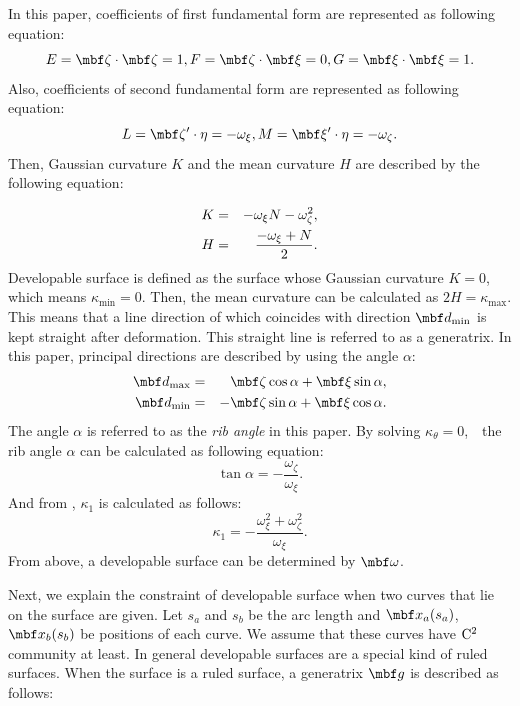 \documentclass[E]{scitrans}
\begin{document}
In this paper, coefficients of first fundamental form are represented as following equation:
\begin{equation}
E = \zetavec \cdot \zetavec = 1, F = \zetavec \cdot \xivec = 0, G = \xivec \cdot \xivec = 1.
\end{equation}
Also, coefficients of second fundamental form are represented as following equation:
\begin{equation}
L = \zetavec' \cdot \eta = -\omega_{\xi}, M = \xivec' \cdot \eta = -\omega_{\zeta}.
\end{equation}
Then, Gaussian curvature $K$ and the mean curvature $H$ are described by
the following equation:

\begin{eqnarray}
\label{eq:GC_expressed_omega}
K &=& -\omega_{\xi} N - \omega_{\zeta}^2, \\
H &=& {\displaystyle{\frac{-\omega_{\xi}+N}{2}}}.
\end{eqnarray}
Developable surface is defined as the surface whose Gaussian curvature $K = 0$, which means $\kappa_{\min}=0$. Then, the mean curvature can be calculated as $2H=\kappa_{\max}$. This means that a line direction of which coincides with direction $\mbold{d}_{\min}$ is kept straight after deformation. This straight line is referred to as a generatrix. 
In this paper, principal directions are described by using the angle $ \alpha $: 
\begin{eqnarray}\label{eq:d1d2_eq}
\mbold{d}_{\max} &=& \zetavec \cos \alpha + \xivec \sin \alpha, \nonumber \\ 
\mbold{d}_{\min} &=& -\zetavec \sin \alpha + \xivec \cos \alpha.
\end{eqnarray}
The angle $ \alpha $ is referred to as the \textit{rib angle} in this paper.
By solving $ \kappa_{\theta} = 0 $,　the rib angle $ \alpha $ can be calculated as following equation:
\begin{equation}\label{eq:alpha_eq}
\tan \alpha = -\frac{\omega_{\zeta}}{\omega_{\xi}}.
\end{equation}
And from , $\kappa_1$ is calculated as follows: 
\begin{equation}\label{eq:kappa1_eq}
\kappa_1 = -\frac{\omega_{\xi}^2 + \omega_{\zeta}^2}{\omega_{\xi}}.
\end{equation}
From above, a developable surface can be determined by $\mbold{\omega}$.

Next, we explain the constraint of developable surface when two curves that lie on the surface are given. Let $s_a$ and $s_b$ be the arc length and $\mbold{x}_a(s_a)$, $\mbold{x}_b(s_b)$ be positions of each curve. We assume that these curves have ${\rm C}^2$ community at least. In general developable surfaces are a special kind of ruled surfaces. When the surface is a ruled surface, a generatrix $ \mbold{g} $ is described as follows:
\end{document}

